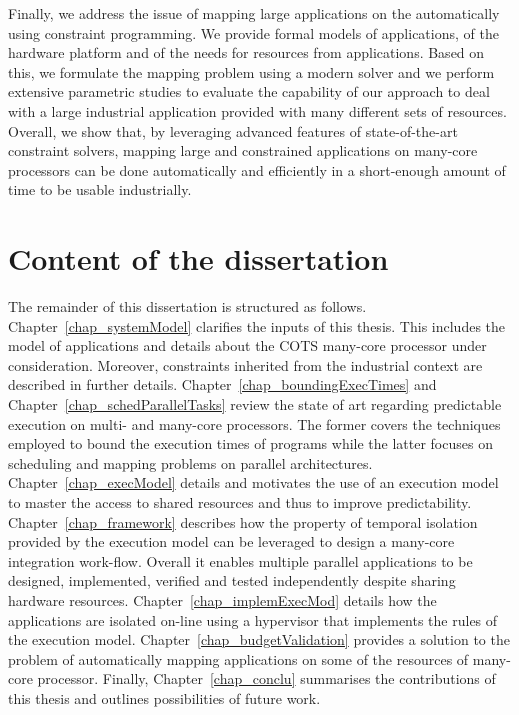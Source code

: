\documentclass[main.tex]{subfiles}
\begin{document}
Finally, we address the issue of mapping large applications on the \mppalong
automatically using constraint programming. We provide formal models of
applications, of the hardware platform and of the needs for resources from
applications. Based on this, we formulate the mapping problem using a modern
solver and we perform extensive parametric studies to evaluate the capability
of our approach to deal with a large industrial application provided with many
different sets of resources. Overall, we show that, by leveraging advanced
features of state-of-the-art constraint solvers, mapping large and constrained
applications on many-core processors can be done automatically and efficiently
in a short-enough amount of time to be usable industrially.


\section{Content of the dissertation}
The remainder of this dissertation is structured as follows.
Chapter~\ref{chap_systemModel} clarifies the inputs of this thesis. This
includes the model of applications and details about the COTS many-core
processor under consideration. Moreover, constraints inherited from the
industrial context are described in further details.
Chapter~\ref{chap_boundingExecTimes} and Chapter~\ref{chap_schedParallelTasks}
review the state of art regarding predictable execution on multi- and many-core
processors. The former covers the techniques employed to bound the execution
times of programs while the latter focuses on scheduling and mapping problems
on parallel architectures.  Chapter~\ref{chap_execModel} details and motivates
the use of an execution model to master the access to shared resources and thus
to improve predictability. Chapter~\ref{chap_framework} describes how the
property of temporal isolation provided by the execution model can be leveraged
to design a many-core integration work-flow. Overall it enables multiple
parallel applications to be designed, implemented, verified and tested
independently despite sharing hardware resources.
Chapter~\ref{chap_implemExecMod} details how the applications are isolated
on-line using a hypervisor that implements the rules of the execution model.
Chapter~\ref{chap_budgetValidation} provides a solution to the problem of
automatically mapping applications on some of the resources of many-core
processor.  Finally, Chapter~\ref{chap_conclu} summarises the contributions of
this thesis and outlines possibilities of future work.



\clearpage
\subbiblio
\end{document}
